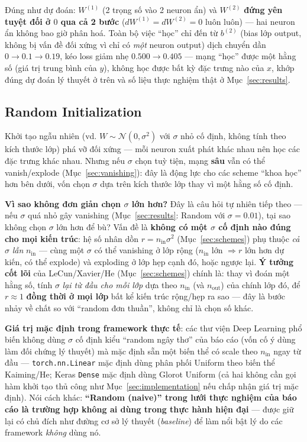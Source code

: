 \documentclass[12pt,a4paper]{article}
\newcommand{\en}[1]{\textit{#1}}
\begin{document}
Đúng như dự đoán: $W^{(1)}$ (2 trọng số vào 2 neuron ẩn) và $W^{(2)}$
\textbf{đứng yên tuyệt đối ở $0$ qua cả 2 bước} ($dW^{(1)}=dW^{(2)}=0$
luôn luôn) --- hai neuron ẩn không bao giờ phân hoá. Toàn bộ việc ``học''
chỉ đến từ $b^{(2)}$ (bias lớp output, không bị vấn đề đối xứng vì chỉ có
\emph{một} neuron output) dịch chuyển dần $0\to0.1\to0.19$, kéo loss
giảm nhẹ $0.500\to0.405$ --- mạng ``học'' được một hằng số (giá trị
trung bình của $y$), không học được bất kỳ đặc trưng nào của $x$, khớp
đúng dự đoán lý thuyết ở trên và số liệu thực nghiệm thật ở
Mục~\ref{sec:results}.

\subsection{Random Initialization}
\label{sec:random}

Khởi tạo ngẫu nhiên (vd. $W\sim\mathcal N(0,\sigma^2)$ với $\sigma$ nhỏ cố
định, không tính theo kích thước lớp) phá vỡ đối xứng --- mỗi neuron xuất
phát khác nhau nên học các đặc trưng khác nhau. Nhưng nếu $\sigma$ chọn
tuỳ tiện, mạng \textbf{sâu} vẫn có thể vanish/explode
(Mục~\ref{sec:vanishing}): đây là động lực cho các scheme ``khoa học'' hơn
bên dưới, vốn chọn $\sigma$ dựa trên kích thước lớp thay vì một hằng số cố
định.

\textbf{Vì sao không đơn giản chọn $\sigma$ lớn hơn?} Đây là câu hỏi tự
nhiên tiếp theo --- nếu $\sigma$ quá nhỏ gây vanishing (Mục~\ref{sec:results}:
Random với $\sigma=0.01$), tại sao không chọn $\sigma$ lớn hơn để bù?
Vấn đề là \textbf{không có một $\sigma$ cố định nào đúng cho mọi kiến
trúc}: hệ số nhân dồn $r=n_{\text{in}}\sigma^2$ (Mục~\ref{sec:schemes})
phụ thuộc \emph{cả} $\sigma$ \emph{lẫn} $n_{\text{in}}$ --- cùng một
$\sigma$ có thể vanishing ở lớp rộng ($n_{\text{in}}$ lớn $\Rightarrow r$
lớn hơn dự kiến, có thể explode) và exploding ở lớp hẹp cạnh đó, hoặc
ngược lại. \textbf{Ý tưởng cốt lõi} của LeCun/Xavier/He (Mục~\ref{sec:schemes})
chính là: thay vì đoán một hằng số, tính $\sigma$ \emph{lại từ đầu cho mỗi
lớp} dựa theo $n_{\text{in}}$ (và $n_{\text{out}}$) của chính lớp đó, để
$r\approx1$ \textbf{đồng thời ở mọi lớp} bất kể kiến trúc rộng/hẹp ra
sao --- đây là bước nhảy về chất so với ``random đơn thuần'', không chỉ là
chọn số khác.

\textbf{Giá trị mặc định trong framework thực tế}: các thư viện Deep
Learning phổ biến không dùng $\sigma$ cố định kiểu ``random ngây thơ'' của
báo cáo (vốn cố ý dùng làm đối chứng lý thuyết) mà mặc định sẵn một biến
thể có scale theo $n_{\text{in}}$ ngay từ đầu --- \texttt{torch.nn.Linear}
mặc định dùng phân phối Uniform theo biến thể Kaiming/He; Keras
\texttt{Dense} mặc định dùng Glorot Uniform (cả hai không cần gọi hàm
khởi tạo thủ công như Mục~\ref{sec:implementation} nếu chấp nhận giá trị
mặc định). Nói cách khác: \textbf{``Random (naive)'' trong lưới thực
nghiệm của báo cáo là trường hợp không ai dùng trong thực hành hiện đại}
--- được giữ lại có chủ đích như đường cơ sở lý thuyết (\en{baseline}) để
làm nổi bật lý do các framework \emph{không} dùng nó.
\end{document}
